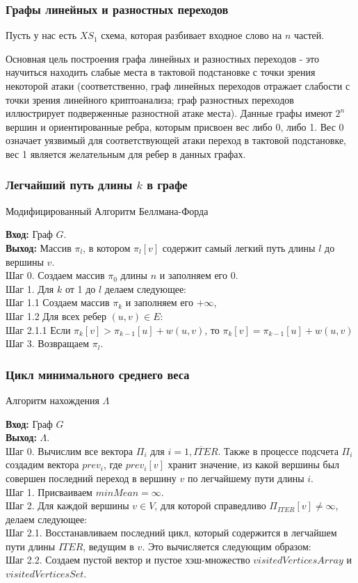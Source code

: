 \documentclass{beamer}
\begin{document}
  \begin{frame}
    \frametitle{Графы линейных и разностных переходов}
Пусть у нас есть $XS_1$ схема, которая разбивает входное слово на $n$ частей.  

Основная цель построения графа линейных и разностных переходов - это научиться находить слабые места в тактовой подстановке с точки зрения некоторой атаки (соответственно, граф линейных переходов отражает слабости с точки зрения линейного криптоанализа; граф разностных переходов иллюстрирует подверженные разностной атаке места).
Данные графы имеют $2^n$ вершин и ориентированные ребра, которым присвоен вес либо 0, либо 1. Вес 0 означает уязвимый для соответствующей атаки переход в тактовой подстановке, вес 1 является желательным для ребер в данных графах.
  \end{frame}
\begin{frame}
    \frametitle{Легчайший путь длины $k$ в графе}
\begin{algorithm}[H]
\caption{Модифицированный Алгоритм Беллмана-Форда}
\label{diff_graph_construct}
\textbf{Вход:} Граф $G$.\\
\textbf{Выход:} Массив $\pi_l$, в котором $\pi_l[v]$ содержит самый легкий путь длины $l$ до вершины $v$.\\
Шаг 0. Создаем массив $\pi_0$ длины $n$ и заполняем его $0$. \\
Шаг 1. Для $k$ от 1 до $l$ делаем следующее:\\
Шаг 1.1 Создаем массив $\pi_k$ и заполняем его $+\infty$,\\
Шаг 1.2 Для всех ребер $(u, v) \in E:$\\
Шаг 2.1.1 Если $\pi_k[v] > \pi_{k-1}[u] + w(u,v)$, то $\pi_k[v] = \pi_{k-1}[u] + w(u,v)$\\
Шаг 3. Возвращаем $\pi_l$.\\
\end{algorithm}
  \end{frame}
\begin{frame}
    \frametitle{Цикл минимального среднего веса}
\begin{algorithm}[H]
\caption{Алгоритм нахождения $\Lambda$}
\label{diff_graph_construct}
\textbf{Вход:} Граф $G$\\
\textbf{Выход:} $\Lambda$.\\
Шаг 0. Вычислим все вектора $\Pi_i$ для $i = \overline{1, ITER}$. Также в процессе подсчета $\Pi_i$ создадим вектора $prev_i$, где $prev_i[v]$ хранит значение, из какой вершины был совершен последний переход в вершину $v$ по легчайшему пути длины $i$.\\
Шаг 1. Присваиваем $minMean = \infty$.\\
Шаг 2. Для каждой вершины $v \in V$, для которой справедливо $\Pi_{ITER}[v] \ne \infty$, делаем следующее:\\
Шаг 2.1. Восстанавливаем последний цикл, который содержится в легчайшем пути длины $ITER$, ведущим в $v$. Это вычисляется следующим образом:\\
Шаг 2.2. Создаем пустой вектор и пустое хэш-множество $visitedVerticesArray$ и $visitedVerticesSet$.\\
\end{algorithm}
  \end{frame}
\end{document}

